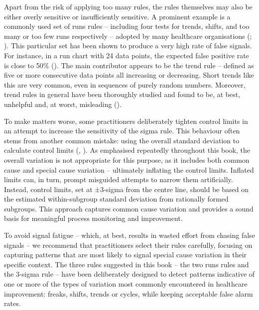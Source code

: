 \documentclass[
]{book}
\begin{document}
Apart from the risk of applying too many rules, the rules themselves may also be either overly sensitive or insufficiently sensitive. A prominent example is a commonly used set of runs rules -- including four tests for trends, shifts, and too many or too few runs respectively -- adopted by many healthcare organisations (; ). This particular set has been shown to produce a very high rate of false signals. For instance, in a run chart with 24 data points, the expected false positive rate is close to 50\% (). The main contributor appears to be the trend rule -- defined as five or more consecutive data points all increasing or decreasing. Short trends like this are very common, even in sequences of purely random numbers. Moreover, trend rules in general have been thoroughly studied and found to be, at best, unhelpful and, at worst, misleading ().

To make matters worse, some practitioners deliberately tighten control limits in an attempt to increase the sensitivity of the sigma rule. This behaviour often stems from another common mistake: using the overall standard deviation to calculate control limits (, ). As emphasised repeatedly throughout this book, the overall variation is not appropriate for this purpose, as it includes both common cause and special cause variation -- ultimately inflating the control limits. Inflated limits can, in turn, prompt misguided attempts to narrow them artificially. Instead, control limits, set at ±3-sigma from the centre line, should be based on the estimated within-subgroup standard deviation from rationally formed subgroups. This approach captures common cause variation and provides a sound basis for meaningful process monitoring and improvement.

To avoid signal fatigue -- which, at best, results in wasted effort from chasing false signals -- we recommend that practitioners select their rules carefully, focusing on capturing patterns that are most likely to signal special cause variation in their specific context. The three rules suggested in this book -- the two runs rules and the 3-sigma rule -- have been deliberately designed to detect patterns indicative of one or more of the types of variation most commonly encountered in healthcare improvement: freaks, shifts, trends or cycles, while keeping acceptable false alarm rates.
\end{document}
